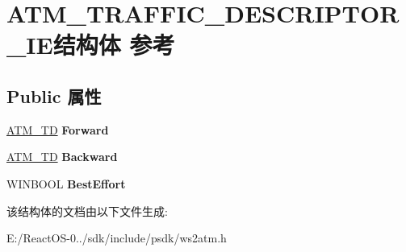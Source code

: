\hypertarget{struct_a_t_m___t_r_a_f_f_i_c___d_e_s_c_r_i_p_t_o_r___i_e}{}\section{A\+T\+M\+\_\+\+T\+R\+A\+F\+F\+I\+C\+\_\+\+D\+E\+S\+C\+R\+I\+P\+T\+O\+R\+\_\+\+I\+E结构体 参考}
\label{struct_a_t_m___t_r_a_f_f_i_c___d_e_s_c_r_i_p_t_o_r___i_e}
\subsection*{Public 属性}
\begin{DoxyCompactItemize}
\item 
\mbox{\label{struct_a_t_m___t_r_a_f_f_i_c___d_e_s_c_r_i_p_t_o_r___i_e_afdfaafb218cac23e1daa5fe0d012a3e1}} 
\hyperlink{struct_a_t_m___t_d}{A\+T\+M\+\_\+\+TD} {\bfseries Forward}
\item 
\mbox{\label{struct_a_t_m___t_r_a_f_f_i_c___d_e_s_c_r_i_p_t_o_r___i_e_aa6c5643fd4085f2f7ee8795dfe1d73ca}} 
\hyperlink{struct_a_t_m___t_d}{A\+T\+M\+\_\+\+TD} {\bfseries Backward}
\item 
\mbox{\label{struct_a_t_m___t_r_a_f_f_i_c___d_e_s_c_r_i_p_t_o_r___i_e_a4b9e85e80fdf5fcb8ddcf27e23b4a838}} 
W\+I\+N\+B\+O\+OL {\bfseries Best\+Effort}
\end{DoxyCompactItemize}


该结构体的文档由以下文件生成\+:\begin{DoxyCompactItemize}
\item 
E\+:/\+React\+O\+S-\/0../sdk/include/psdk/ws2atm.\+h\end{DoxyCompactItemize}
